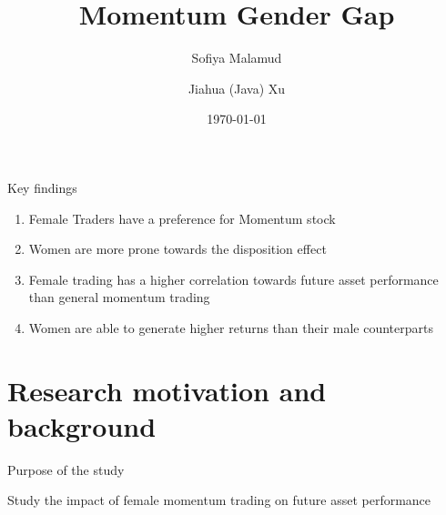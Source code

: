 \documentclass{beamer}
\title[Short title]{Momentum Gender Gap} %
\author{Sofiya Malamud \and Jiahua (Java) Xu} %
\institute[EPFL]
{
	Sofiya Malamud \and Jiahua (Java) Xu
\medskip
}
\date{\today} %
\begin{document}
\begin{frame}
\titlepage %
\end{frame}




\begin{frame}{Key findings}

\begin{enumerate}[A]
	\item Female Traders have a preference for Momentum stock
	\item Women are more prone towards the disposition effect
	\item Female trading has a higher correlation towards future asset performance than general momentum trading 
	\item Women are able to generate higher returns than their male counterparts
\end{enumerate}

\end{frame}



\section{Research motivation and background}


\begin{frame}{Purpose of the study}


Study the impact of female momentum trading on future asset performance

%


\end{frame}
\end{document}
